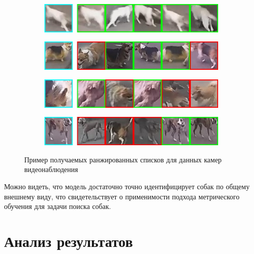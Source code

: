 \begin{figure}[ht]
	\centering
	\begin{subfigure}[b]{\textwidth}
		\includegraphics{images/petsearch/ranked_lists/1/collage.jpg}
	\end{subfigure}
	\par\vspace{\abovecaptionskip}
	\begin{subfigure}[b]{\textwidth}
		\includegraphics{images/petsearch/ranked_lists/4/collage.jpg}
	\end{subfigure}
	\par\vspace{\abovecaptionskip}
	\begin{subfigure}[b]{\textwidth}
		\includegraphics{images/petsearch/ranked_lists/3/collage.jpg}
	\end{subfigure}
	\par\vspace{\abovecaptionskip}
	\begin{subfigure}[b]{\textwidth}
		\includegraphics{images/petsearch/ranked_lists/2/collage.jpg}
	\end{subfigure}
	\caption{Пример получаемых ранжированных списков для данных камер видеонаблюдения}
	\label{fig:unicom_ranked}
\end{figure}

Можно видеть, что модель достаточно точно идентифицирует собак по общему внешнему виду, что свидетельствует о применимости подхода метрического обучения для задачи поиска собак.


\section{Анализ результатов}

